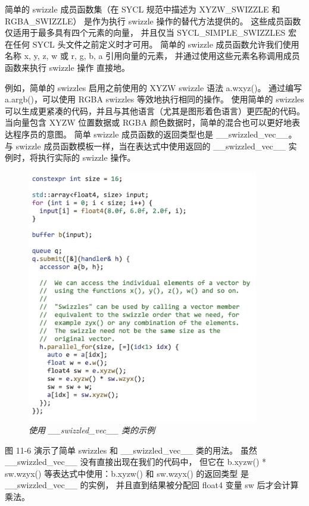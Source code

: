 简单的 swizzle 成员函数集（在 SYCL 规范中描述为 XYZW\_SWIZZLE 和 RGBA\_SWIZZLE）
是作为执行 swizzle 操作的替代方法提供的。 这些成员函数仅适用于最多具有四个元素的向量，
并且仅当 SYCL\_SIMPLE\_SWIZZLES 宏在任何 SYCL 头文件之前定义时才可用。 
简单的 swizzle 成员函数允许我们使用名称 {x, y, z, w} 或 {r, g, b, a} 引用向量的元素，
并通过使用这些元素名称调用成员函数来执行 swizzle 操作 直接地。

例如，简单的 swizzles 启用之前使用的 XYZW swizzle 语法 a.wxyz()。 
通过编写 a.argb()，可以使用 RGBA swizzles 等效地执行相同的操作。 
使用简单的 swizzles 可以生成更紧凑的代码，并且与其他语言（尤其是图形着色语言）更匹配的代码。 
当向量包含 XYZW 位置数据或 RGBA 颜色数据时，简单的混合也可以更好地表达程序员的意图。 
简单 swizzle 成员函数的返回类型也是 \_\_swizzled\_vec\_\_。 
与 swizzle 成员函数模板一样，当在表达式中使用返回的 \_\_swizzled\_vec\_\_ 实例时，将执行实际的 swizzle 操作。

\begin{figure}[H]
	\centering
	\includegraphics[width=0.9\textwidth]{figs/F11.6.png}
	\caption{\textit{使用 \_\_swizzled\_vec\_\_ 类的示例 }}
\end{figure}

图 11-6 演示了简单 swizzles 和 \_\_swizzled\_vec\_\_ 类的用法。 
虽然 \_\_swizzled\_vec\_\_ 没有直接出现在我们的代码中，
但它在 b.xyzw() * sw.wzyx() 等表达式中使用：b.xyzw() 和 sw.wzyx() 的返回类型
是 \_\_swizzled\_vec\_\_ 的实例， 并且直到结果被分配回 float4 变量 sw 后才会计算乘法。

